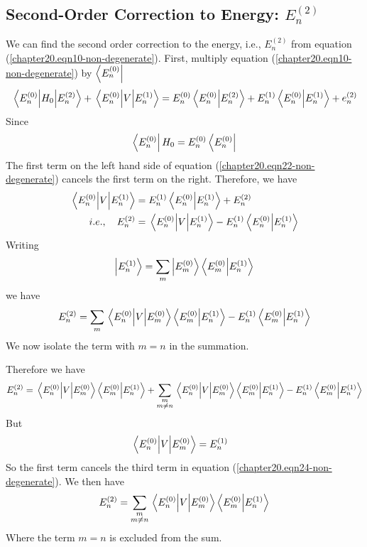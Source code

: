 	
	\subsection{Second-Order Correction to Energy: \texorpdfstring{$E_n^{(2)}$}{PDFstring}}
	
	We can find the second order correction to the energy, i.e., $E^{(2)}_n$ from equation (\ref{chapter20.eqn10-non-degenerate}). First, multiply equation (\ref{chapter20.eqn10-non-degenerate}) by $\bra{E_n^{(0)}}$ 
	\begin{equation}
		\matrixel{E_n^{(0)}} {H_0} {E_n^{(2)}} + \matrixel{E_n^{(0)}} {V} {E_n^{(1)}} = E_n^{(0)} \braket{E_n^{(0)}}{E_n^{(2)}} + E_n^{(1)} \braket{E_n^{(0)}}{E_n^{(1)}} + e_n^{(2)}
		\label{chapter20.eqn22-non-degenerate}
	\end{equation}
	Since
	\begin{equation}
		\bra{E_n^{(0)}} H_0 = E_n^{(0)} \bra{E_n^{(0)}}
	\end{equation}
	The first term on the left hand side of equation (\ref{chapter20.eqn22-non-degenerate}) cancels the first term on the right. Therefore, we have
	\begin{align}
		\matrixel{E_n^{(0)}} {V} {E_n^{(1)}} 
		&=  E_n^{(1)} \braket{E_n^{(0)}}{E_n^{(1)}} + E_n^{(2)}\\
		i.e., \quad E_n^{(2)} &=  \matrixel{E_n^{(0)}} {V} {E_n^{(1)}}  - E_n^{(1)} \braket{E_n^{(0)}}{E_n^{(1)}}
		\label{chapter20.eqn23-non-degenerate}
	\end{align}
	Writing
	\begin{equation}
		\ket{E_n^{(1)}} = \sum_{m} \ket{E_m^{(0)}} \braket{E_m^{(0)}}{E_n^{(1)}}
	\end{equation}
	we have
	\begin{equation}
		E_n^{(2)} = \sum_{m} \matrixel{E_n^{(0)}} {V} {E_m^{(0)}} \braket{E_m^{(0)}}{E_n^{(1)}}  -  E_n^{(1)} \braket{E_m^{(0)}}{E_n^{(1)}}
	\end{equation}
	We now isolate the term with $m=n$ in the summation.
	
	Therefore we have
	\begin{equation}
		E_n^{(2)} = \matrixel{E_n^{(0)}} {V} {E_m^{(0)}} \braket{E_m^{(0)}}{E_n^{(1)}} + \sum_{\substack{m\\ m \neq n}} \matrixel{E_n^{(0)}} {V} {E_m^{(0)}} \braket{E_m^{(0)}}{E_n^{(1)}}  -  E_n^{(1)} \braket{E_m^{(0)}}{E_n^{(1)}}
		\label{chapter20.eqn24-non-degenerate}
	\end{equation}
	But
	\begin{align}
		\matrixel{E_n^{(0)}} {V} {E_m^{(0)}} &= E_n^{(1)}
	\end{align}
	So the first term cancels the third term in equation (\ref{chapter20.eqn24-non-degenerate}). We then have
	\begin{equation}
		E_n^{(2)} = \sum_{\substack{m\\ m \neq n}} \matrixel{E_n^{(0)}} {V} {E_m^{(0)}} \braket{E_m^{(0)}}{E_n^{(1)}}
		\label{chapter20.eqn25-non-degenerate}
	\end{equation}
	Where the 
	term $m=n$ is excluded from the sum.

